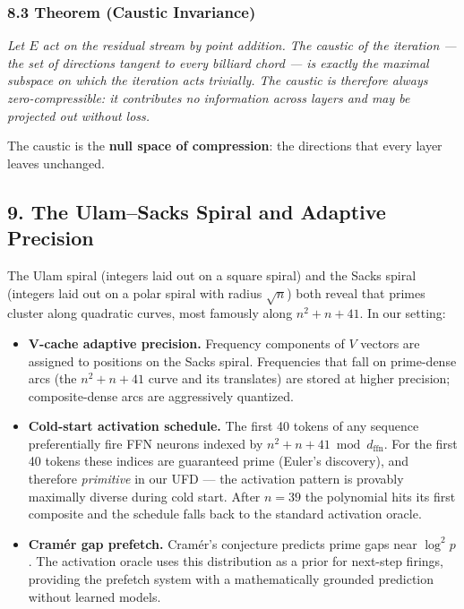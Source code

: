 \documentclass[
  11pt,
]{article}
\providecommand{\tightlist}{%
  \setlength{\itemsep}{0pt}\setlength{\parskip}{0pt}}
\begin{document}
\hypertarget{theorem-caustic-invariance}{%
\subsubsection{8.3 Theorem (Caustic
Invariance)}\label{theorem-caustic-invariance}}

\emph{Let \(E\) act on the residual stream by point addition. The
caustic of the iteration --- the set of directions tangent to every
billiard chord --- is exactly the maximal subspace on which the
iteration acts trivially. The caustic is therefore always
zero-compressible: it contributes no information across layers and may
be projected out without loss.}

The caustic is the \textbf{null space of compression}: the directions
that every layer leaves unchanged.

\hypertarget{the-ulamsacks-spiral-and-adaptive-precision}{%
\subsection{9. The Ulam--Sacks Spiral and Adaptive
Precision}\label{the-ulamsacks-spiral-and-adaptive-precision}}

The Ulam spiral (integers laid out on a square spiral) and the Sacks
spiral (integers laid out on a polar spiral with radius \(\sqrt n\))
both reveal that primes cluster along quadratic curves, most famously
along \(n^2 + n + 41\). In our setting:

\begin{itemize}
\tightlist
\item
  \textbf{V-cache adaptive precision.} Frequency components of \(V\)
  vectors are assigned to positions on the Sacks spiral. Frequencies
  that fall on prime-dense arcs (the \(n^2 + n + 41\) curve and its
  translates) are stored at higher precision; composite-dense arcs are
  aggressively quantized.
\item
  \textbf{Cold-start activation schedule.} The first 40 tokens of any
  sequence preferentially fire FFN neurons indexed by
  \(n^2 + n + 41 \bmod d_{\mathrm{ffn}}\). For the first 40 tokens these
  indices are guaranteed prime (Euler's discovery), and therefore
  \emph{primitive} in our UFD --- the activation pattern is provably
  maximally diverse during cold start. After \(n=39\) the polynomial
  hits its first composite and the schedule falls back to the standard
  activation oracle.
\item
  \textbf{Cramér gap prefetch.} Cramér's conjecture predicts prime gaps
  near \(\log^2 p\). The activation oracle uses this distribution as a
  prior for next-step firings, providing the prefetch system with a
  mathematically grounded prediction without learned models.
\end{itemize}
\end{document}
